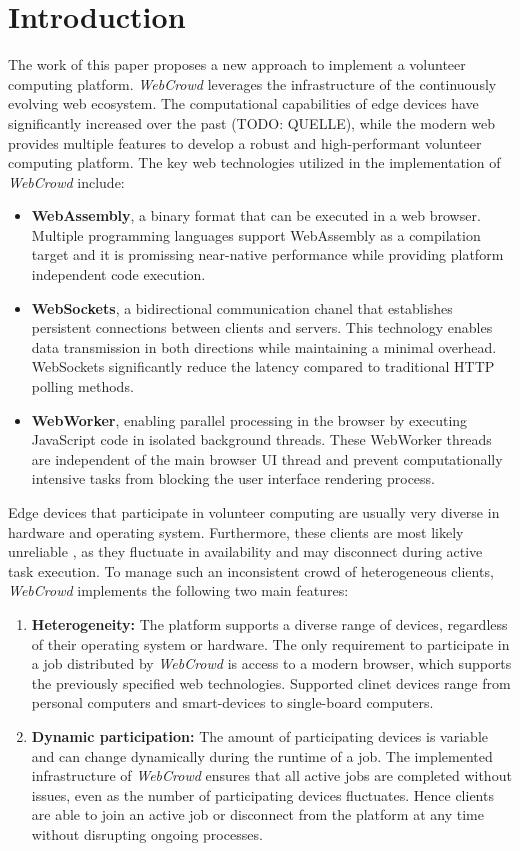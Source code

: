\chapter{Introduction}
\label{ch:intro}
The work of this paper proposes a new approach to implement a volunteer computing platform. \emph{WebCrowd} leverages the infrastructure of the continuously evolving web ecosystem. The computational capabilities of edge devices have significantly increased over the past (TODO: QUELLE), while the modern web provides multiple features to develop a robust and high-performant volunteer computing platform. The key web technologies utilized in the implementation of \emph{WebCrowd} include:
\begin{itemize}
    \item \textbf{WebAssembly}, a binary format that can be executed in a web browser. Multiple programming languages support WebAssembly as a compilation target and it is promissing near-native performance while providing platform independent code execution. \cite{methodology:wasm}
    \item \textbf{WebSockets}, a bidirectional communication chanel that establishes persistent connections between clients and servers. This technology enables data transmission in both directions while maintaining a minimal overhead. WebSockets significantly reduce the latency compared to traditional \acs{HTTP} polling methods. \cite{methodology:websockets3} 
    \item \textbf{WebWorker}, enabling parallel processing in the browser by executing JavaScript code in isolated background threads. These WebWorker threads are independent of the main browser UI thread and prevent computationally intensive tasks from blocking the user interface rendering process. \cite{methodology:webworkers}
\end{itemize}
Edge devices that participate in volunteer computing are usually very diverse in hardware and operating system. \cite{intro:diverseDevices} Furthermore, these clients are most likely unreliable \cite{relatedwork:boinc1}, as they fluctuate in availability and may disconnect during active task execution. To manage such an inconsistent crowd of heterogeneous clients, \emph{WebCrowd} implements the following two main features:
\begin{enumerate}
    \item \textbf{Heterogeneity:} The platform supports a diverse range of devices, regardless of their operating system or hardware. The only requirement to participate in a job distributed by \emph{WebCrowd} is access to a modern browser, which supports the previously specified web technologies. Supported clinet devices range from personal computers and smart-devices to single-board computers.
    \item \textbf{Dynamic participation:} The amount of participating devices is variable and can change dynamically during the runtime of a job. The implemented infrastructure of \emph{WebCrowd} ensures that all active jobs are completed without issues, even as the number of participating devices fluctuates. Hence clients are able to join an active job or disconnect from the platform at any time without disrupting ongoing processes.
\end{enumerate}

